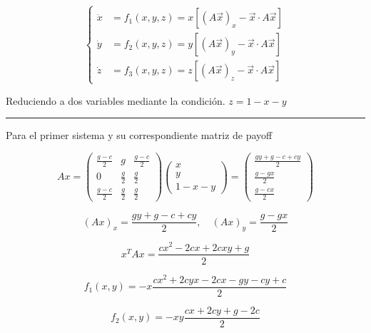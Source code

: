\documentclass[twocolumn,aps,prl]{revtex4-1}
\newcommand*\sepline{%
  \begin{center}
    \rule[1ex]{.5\textwidth}{.5pt}
  \end{center}}
\begin{document}
$$ \left\lbrace
\begin{aligned}
  \dot{x} &= f_1(x,y,z) = x \left[(A \vec{x})_{x}-\vec{x} \cdot A \vec{x}\right] \\
  \dot{y} &= f_2(x,y,z) = y \left[(A \vec{x})_{y}-\vec{x} \cdot A \vec{x}\right] \\
  \dot{z} &= f_3(x,y,z) = z \left[(A \vec{x})_{z}-\vec{x} \cdot A \vec{x}\right]
\end{aligned}
\right.
$$

Reduciendo a dos variables mediante la condición. $z = 1-x-y$

\sepline

Para el primer sistema y su correspondiente matriz de payoff

$$
Ax = 
\begin{pmatrix}
    \frac{g-c}{2}&g&\frac{g-c}{2}\\
    0&\frac{g}{2}&\frac{g}{2}\\
    \frac{g-c}{2}&\frac{g}{2}&\frac{g}{2}
\end{pmatrix}
\begin{pmatrix}
    x\\
    y\\ 
    1-x-y
\end{pmatrix}
=
\begin{pmatrix}
    \frac{gy+g-c+cy}{2}\\ 
    \frac{g-gx}{2}\\ 
    \frac{g-cx}{2}
\end{pmatrix}
$$

$$(Ax)_x = \frac{gy+g-c+cy}{2}
,\quad 
(Ax)_y = \frac{g-gx}{2}
$$

$$
x^T Ax = \frac{cx^2-2cx+2cxy+g}{2}
$$

$$
f_1(x, y) = 
-x \frac{
    cx^2
    + 2cyx
    - 2cx
    - gy
    - cy
    + c
    }{2}
$$

$$
f_2(x, y) = 
-xy \frac{cx+2cy+g-2c}{2}
$$


\end{document}
